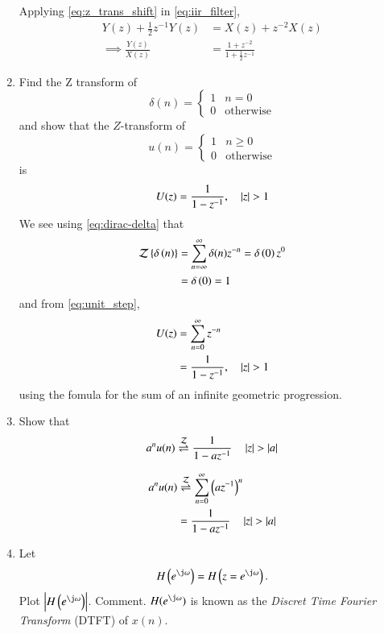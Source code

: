 \documentclass[journal,12pt,twocolumn]{IEEEtran}
\renewcommand\thesection{\arabic{section}}
\begin{document}
\begin{enumerate}[label=\thesection.\arabic*]
\solution  Applying \eqref{eq:z_trans_shift} in \eqref{eq:iir_filter},
\begin{align}
Y(z) + \frac{1}{2}z^{-1}Y(z) &= X(z)+z^{-2}X(z) \\
\implies \frac{Y(z)}{X(z)} &= \frac{1 + z^{-2}}{1 + \frac{1}{2}z^{-1}}
\label{eq:freq_resp}
\end{align}

\item Find the Z transform of 
\begin{equation}
\delta(n) =
\begin{cases}
1 & n = 0 \\
0 & \text{otherwise}
\end{cases}
\label{eq:dirac-delta}
\end{equation}
and show that the $Z$-transform of
\begin{equation}
\label{eq:unit_step}
u(n) =
\begin{cases}
1 & n \ge 0 \\
0 & \text{otherwise}
\end{cases}
\end{equation}
is
\begin{equation}
U(z) = \frac{1}{1-z^{-1}}, \quad \left\vert z\right\vert > 1
\end{equation}
\solution We see using \eqref{eq:dirac-delta} that
\begin{align}
	\mathcal{Z}\left\{\delta\left(n\right)\right\} &= \sum_{n=\infty}^{\infty} \delta(n)z^{-n} = \delta\left(0\right)z^{0} \\
	&=	\delta\left(0\right) = 1	
\end{align}
and from \eqref{eq:unit_step},
\begin{align}
U(z) &= \sum _{n= 0}^{\infty}z^{-n} \\
&=\frac{1}{1-z^{-1}}, \quad \left\vert z\right\vert > 1
\end{align}
using the fomula for the sum of an infinite geometric progression.

\item Show that 
\begin{equation}
\label{eq:anun}
a^nu(n) \overset{\mathcal{Z}}{ \rightleftharpoons} \frac{1}{1-az^{-1}} \quad \left\vert z\right\vert > \left\vert a\right\vert
\end{equation}

\solution
\begin{align}
	a^nu(n) &\overset{\mathcal{Z}}{ \rightleftharpoons} \sum_{n = 0}^{\infty}\left(az^{-1}\right)^n \\
			&= \frac{1}{1-az^{-1}} \quad \left\vert z\right\vert > \left\vert a\right\vert
\end{align}

\item 
Let
\begin{equation}
H\brak{e^{\j \omega}} = H\brak{z = e^{\j \omega}}.
\end{equation}
Plot $\abs{H\brak{e^{\j \omega}}}$.  Comment.  $H(e^{\j \omega})$ is
known as the {\em Discret Time Fourier Transform} (DTFT) of $x(n)$.


\end{enumerate}
\end{document}
